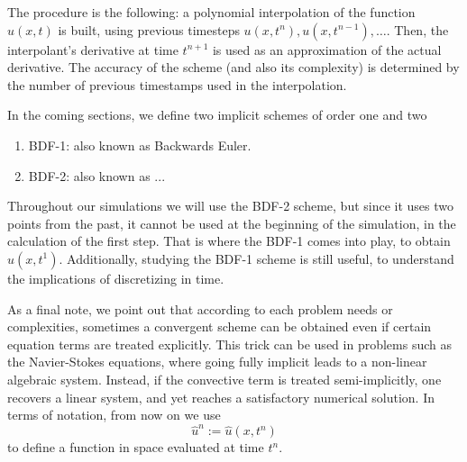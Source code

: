 \documentclass[../../main.tex]{subfiles}
\begin{document}
The procedure is the following: a polynomial interpolation of the function $u(x,t)$ is built, 
using previous timesteps $u(x,t^{n}), u(x,t^{n-1}), \ldots$.
Then, the interpolant's derivative at time $t^{n+1}$ is used as an approximation of the actual derivative.
The accuracy of the scheme (and also its complexity) is determined by the number of previous timestamps used in the interpolation. 

In the coming sections, we define two implicit schemes of order one and two
\begin{enumerate}
    \item BDF-1: also known as Backwards Euler.
    \item BDF-2: also known as ... 
\end{enumerate}
Throughout our simulations we will use the BDF-2 scheme, but since it uses two points from the past, 
it cannot be used at the beginning of the simulation, in the calculation of the first step. 
That is where the BDF-1 comes into play, to obtain $u(x,t^1)$.
Additionally, studying the BDF-1 scheme is still useful, to understand the implications of discretizing in time.  

As a final note, we point out that according to each problem needs or complexities, sometimes a convergent scheme can be obtained even if certain equation terms are treated explicitly.
This trick can be used in problems such as the Navier-Stokes equations, where going fully implicit leads to a non-linear algebraic system. 
Instead, if the convective term is treated semi-implicitly, one recovers a linear system, and yet reaches a satisfactory numerical solution.
In terms of notation, from now on we use
\begin{equation}
    \hat{u}^n := \hat{u}(x,t^n)
\end{equation}
to define a function in space evaluated at time $t^n$.
\end{document}
